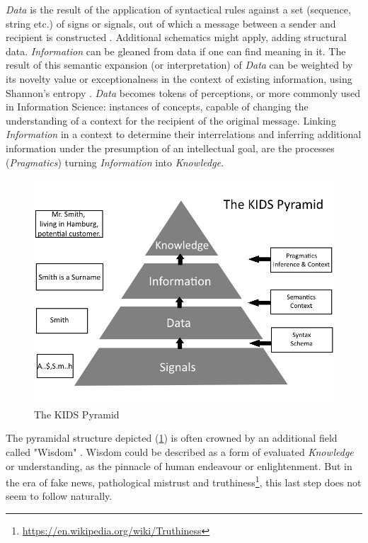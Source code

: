 \documentclass[a4paper,english,twoside,BCOR1.5cm,headsepline,DIV12,appendixprefix,final,12pt]{scrbook}
\newcommand\footnoteurl[1]{\footnote{\scriptsize\url{#1}}}
\begin{document}
\textit{Data} is the result of the application of syntactical rules against a set (sequence, string etc.) of signs or signals, out of which a message between a sender and recipient is constructed \cite{bodendorf2003daten}. Additional schematics might apply, adding structural data. \textit{Information} can be gleaned from data if one can find meaning in it. The result of this semantic expansion (or interpretation) of \textit{Data} can be weighted by its novelty value or exceptionalness in the context of existing information, using Shannon's entropy \cite{shannon48}. \textit{Data} becomes tokens of perceptions, or more commonly used in Information Science: instances of concepts, capable of changing the understanding of a context for the recipient of the original message. Linking \textit{Information} in a context to determine their interrelations and inferring additional information under the presumption of an intellectual goal, are the processes (\textit{Pragmatics}) turning \textit{Information} into \textit{Knowledge}.

\begin{figure}[t]
\centering
  \includegraphics[width=\textwidth]{images/kidsPyramid.png}
  \caption{The KIDS Pyramid \cite{bodendorf2003daten}}
  \label{fig:kids}
\end{figure}

The pyramidal structure depicted (\cref{fig:kids}) is often crowned by an additional field called "Wisdom" \cite{Rowley2007}. Wisdom could be described as a form of evaluated \textit{Knowledge} or understanding, as the pinnacle of human endeavour or enlightenment. But in the era of fake news, pathological mistrust and truthiness\footnoteurl{https://en.wikipedia.org/wiki/Truthiness}, this last step does not seem to follow naturally.
\end{document}
